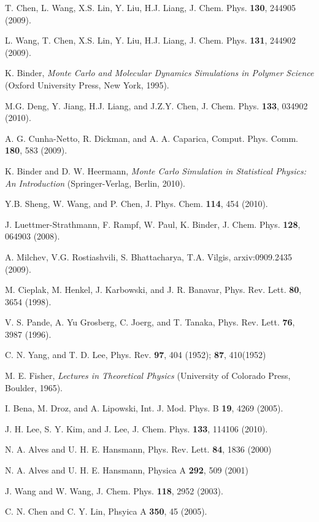\documentclass[aps,pre,twocolumn,showpacs,preprintnumbers,amsmath,amssymb]{revtex4-1}
\begin{document}
\begin{thebibliography}{10}
T. Chen, L. Wang, X.S. Lin, Y. Liu, H.J. Liang, J. Chem. Phys.
{\bf 130}, 244905 (2009).

L. Wang, T. Chen, X.S. Lin, Y. Liu, H.J. Liang, J. Chem. Phys.
{\bf 131}, 244902 (2009).

K. Binder, {\it Monte Carlo and Molecular Dynamics Simulations in
Polymer Science} (Oxford University Press, New York, 1995).

M.G. Deng, Y. Jiang, H.J. Liang, and J.Z.Y. Chen, J. Chem. Phys.
{\bf 133}, 034902 (2010).

A. G. Cunha-Netto, R. Dickman, and A. A. Caparica, Comput. Phys. Comm.
{\bf 180}, 583 (2009).

K. Binder and D. W. Heermann, {\it Monte Carlo Simulation in
Statistical Physics: An Introduction} (Springer-Verlag, Berlin, 2010).

Y.B. Sheng, W. Wang, and P. Chen, J. Phys. Chem. {\bf 114},
454 (2010).

J. Luettmer-Strathmann, F. Rampf, W. Paul, K. Binder, J. Chem. Phys.
{\bf 128}, 064903 (2008).

A. Milchev, V.G. Rostiashvili, S. Bhattacharya, T.A. Vilgis,
arxiv:0909.2435 (2009).

M. Cieplak, M. Henkel, J. Karbowski, and J. R. Banavar,
Phys. Rev. Lett. {\bf 80}, 3654 (1998).

V. S. Pande, A. Yu Grosberg, C. Joerg, and T. Tanaka,
Phys. Rev. Lett. {\bf 76}, 3987 (1996).

C. N. Yang, and T. D. Lee, Phys. Rev. {\bf 97}, 404 (1952);
{\bf 87}, 410(1952)

M. E. Fisher, {\it Lectures in Theoretical Physics} (University of Colorado
Press, Boulder, 1965).

I. Bena, M. Droz, and A. Lipowski, Int. J. Mod. Phys. B {\bf 19},
4269 (2005).

J. H. Lee, S. Y. Kim, and J. Lee, J. Chem. Phys. {\bf 133}, 114106 (2010).

N. A. Alves and U. H. E. Hansmann, Phys. Rev. Lett. {\bf 84}, 1836 (2000)

N. A. Alves and U. H. E. Hansmann, Physica A {\bf 292}, 509 (2001)

J. Wang and W. Wang, J. Chem. Phys. {\bf 118}, 2952 (2003).

C. N. Chen and C. Y. Lin, Phsyica A {\bf 350}, 45 (2005).

\end{thebibliography}
\end{document}
